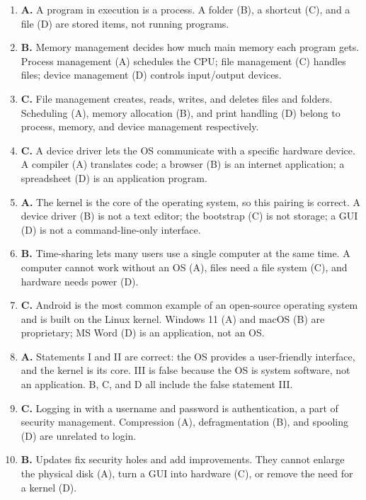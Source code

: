 \documentclass[11pt]{article}
\begin{document}
\begin{enumerate}[label=\textbf{Q\arabic*.}, leftmargin=*]
  during startup. A device driver (A) controls one device; the kernel (B) is
  the OS core loaded by the boot process; a compiler (D) translates programs.
\item \textbf{A.} A program in execution is a process. A folder (B), a shortcut
  (C), and a file (D) are stored items, not running programs.
\item \textbf{B.} Memory management decides how much main memory each program
  gets. Process management (A) schedules the CPU; file management (C) handles
  files; device management (D) controls input/output devices.
\item \textbf{C.} File management creates, reads, writes, and deletes files and
  folders. Scheduling (A), memory allocation (B), and print handling (D) belong
  to process, memory, and device management respectively.
\item \textbf{C.} A device driver lets the OS communicate with a specific
  hardware device. A compiler (A) translates code; a browser (B) is an
  internet application; a spreadsheet (D) is an application program.
\item \textbf{A.} The kernel is the core of the operating system, so this
  pairing is correct. A device driver (B) is not a text editor; the bootstrap
  (C) is not storage; a GUI (D) is not a command-line-only interface.
\item \textbf{B.} Time-sharing lets many users use a single computer at the
  same time. A computer cannot work without an OS (A), files need a file
  system (C), and hardware needs power (D).
\item \textbf{C.} Android is the most common example of an open-source
  operating system and is built on the Linux kernel. Windows 11 (A) and macOS
  (B) are proprietary; MS Word (D) is an application, not an OS.
\item \textbf{A.} Statements I and II are correct: the OS provides a
  user-friendly interface, and the kernel is its core. III is false because the
  OS is system software, not an application. B, C, and D all include the false
  statement III.
\item \textbf{C.} Logging in with a username and password is authentication, a
  part of security management. Compression (A), defragmentation (B), and
  spooling (D) are unrelated to login.
\item \textbf{B.} Updates fix security holes and add improvements. They cannot
  enlarge the physical disk (A), turn a GUI into hardware (C), or remove the
  need for a kernel (D).


\end{enumerate}
\end{document}
